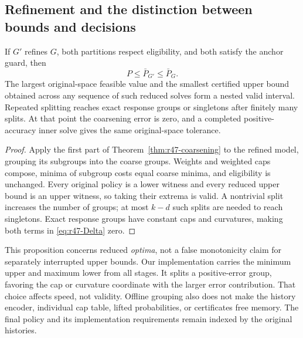 \subsection{Refinement and the distinction between bounds and decisions}
\begin{proposition}\label{prop:r47-refinement}
If $G'$ refines $G$, both partitions respect eligibility, and both satisfy the anchor guard, then
\begin{equation}\label{eq:r47-refinement}
 P\leq\bar P_{G'}\leq\bar P_G.
\end{equation}
The largest original-space feasible value and the smallest certified upper bound obtained across any sequence of such reduced solves form a nested valid interval. Repeated splitting reaches exact response groups or singletons after finitely many splits. At that point the coarsening error is zero, and a completed positive-accuracy inner solve gives the same original-space tolerance.
\end{proposition}
\begin{proof}
Apply the first part of Theorem~\ref{thm:r47-coarsening} to the refined model, grouping its subgroups into the coarse groups. Weights and weighted caps compose, minima of subgroup costs equal coarse minima, and eligibility is unchanged. Every original policy is a lower witness and every reduced upper bound is an upper witness, so taking their extrema is valid. A nontrivial split increases the number of groups; at most $k-d$ such splits are needed to reach singletons. Exact response groups have constant caps and curvatures, making both terms in \eqref{eq:r47-Delta} zero.
\end{proof}
This proposition concerns reduced \emph{optima}, not a false monotonicity claim for separately interrupted upper bounds. Our implementation carries the minimum upper and maximum lower from all stages. It splits a positive-error group, favoring the cap or curvature coordinate with the larger error contribution. That choice affects speed, not validity. Offline grouping also does not make the history encoder, individual cap table, lifted probabilities, or certificates free memory. The final policy and its implementation requirements remain indexed by the original histories.
